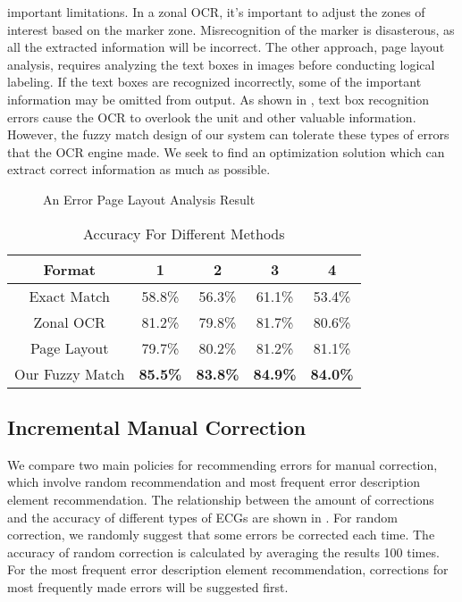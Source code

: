 important limitations. 
In a zonal OCR, it's important to adjust the zones of interest 
based on the marker zone. Misrecognition of the marker 
is disasterous, as all the extracted information will be incorrect. 
The other approach, page layout analysis, requires analyzing 
the text boxes in images before conducting logical labeling. 
If the text boxes are recognized incorrectly, some of the
important information may be omitted from output. 
As shown in , 
text box recognition errors cause the OCR to overlook the unit and 
other valuable information. 
However, the fuzzy match design of our system can 
tolerate these types of errors that the OCR engine made. 
We seek to find an optimization solution which can extract 
correct information as much as possible. 


\begin{figure}[ht]
\centering
{}
\caption{An Error Page Layout Analysis Result}
\label{fig:errorpl}
\end{figure}

\begin{table}[!hbp]
\centering
\caption{Accuracy For Different Methods}
\label{tab:compare}
\begin{tabular}{|c|c|c|c|c|}
\hline
Format & 1 & 2 & 3 & 4\\
\hline \hline
Exact Match & 58.8\% & 56.3\% & 61.1\% & 53.4\% \\
\hline
Zonal OCR & 81.2\% & 79.8\% & 81.7\% & 80.6\% \\
\hline
Page Layout & 79.7\% & 80.2\% & 81.2\% & 81.1\% \\
\hline
Our Fuzzy Match & {\bf 85.5\%} & {\bf 83.8\%} & {\bf 84.9\%} & {\bf 84.0\%}\\ 
\hline
\end{tabular}
\end{table}

\subsection{Incremental Manual Correction}
We compare two main policies for recommending errors for manual correction, 
which involve random recommendation and most frequent error 
description element recommendation. The relationship between the 
amount of corrections and the accuracy of different types of 
ECGs are shown in . For random correction, 
we randomly suggest that some errors be corrected each time. 
The accuracy of random correction is calculated by averaging 
the results 100 times. For the most frequent error 
description element recommendation, 
corrections for most frequently made errors will be suggested first. 

